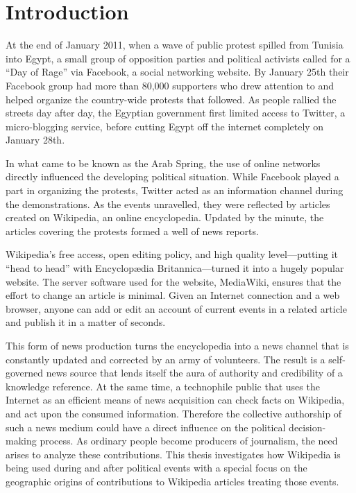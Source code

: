 \chapter{Introduction}\label{ch:introduction}


At the end of January 2011, when a wave of public protest spilled from Tunisia into Egypt, a small group of opposition parties and political activists called for a ``Day of Rage'' via Facebook, a social networking website.
By January 25th their Facebook group had more than 80,000 supporters who drew attention to and helped organize the country-wide protests that followed. 
As people rallied the streets day after day, the Egyptian government first limited access to Twitter, a micro-blogging service, before cutting Egypt off the internet completely on January 28th.\cite{econ18013760, szegypt}

In what came to be known as the Arab Spring, the use of online networks directly influenced the  developing political situation.
While Facebook played a part in organizing the protests, Twitter acted as an information channel during the demonstrations.
As the events unravelled, they were reflected by articles created on Wikipedia, an online encyclopedia.
Updated by the minute, the articles covering the protests formed a well of news reports.\cite{wikiegypt}

Wikipedia's free access, open editing policy, and high quality level---putting it ``head to head''\cite{giles2005internet} with Encyclopædia Britan\-nica---turned it into a hugely popular website\cite{wikipv}.
The server software used for the website, MediaWiki, ensures that the effort to change an article is minimal.
Given an Internet connection and a web browser, anyone can add or edit an account of current events in a related article and publish it in a matter of seconds.

This form of news production turns the encyclopedia into a news channel that is constantly updated and corrected by an army of volunteers.
The result is a self-governed news source that lends itself the aura of authority and credibility of a knowledge reference.
At the same time, a technophile public that uses the Internet as an efficient means of news acquisition can check facts on Wikipedia, and act upon the consumed information.\cite[p. 424--427]{chadwick2009routledge}
Therefore the collective authorship of such a news medium could have a direct influence on the political decision-making process.
As ordinary people become producers of journalism, the need arises to analyze these contributions. 
This thesis investigates  how Wikipedia is being used during and after political events with a special focus on the geographic origins of contributions to Wikipedia articles treating those events.

